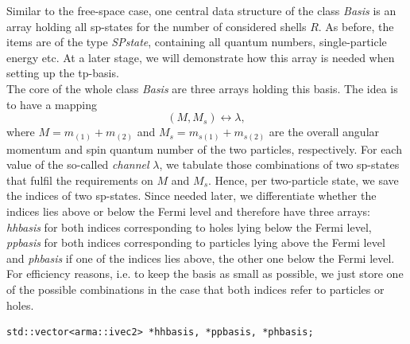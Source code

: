 Similar to the free-space case, one central data structure of the class \textit{Basis} is an array holding all sp-states for the number of considered shells $R$. As before, the items are of the type \textit{SPstate}, containing all quantum numbers, single-particle energy etc. At a later stage, we will demonstrate how this array is needed when setting up the tp-basis. \\
The core of the whole class \textit{Basis} are three arrays holding this basis. The idea is to have a mapping
\[
(M,M_s) \leftrightarrow \lambda,
\]
where $M = m_{(1)} + m_{(2)}$ and $M_s = m_{s(1)}+m_{s(2)}$ are the overall angular momentum and spin quantum number of the two particles, respectively. For each value of the so-called \textit{channel }$\lambda$, we tabulate those combinations of two sp-states that fulfil the requirements on $M$ and $M_s$. Hence, per two-particle state, we save the indices of two sp-states. Since needed later, we differentiate whether the indices lies above or below the Fermi level and therefore have three arrays: \textit{hhbasis} for both indices corresponding to holes lying below the Fermi level, \textit{ppbasis} for both indices corresponding to particles lying above the Fermi level and \textit{phbasis} if one of the indices lies above, the other one below the Fermi level. For efficiency reasons, i.e. to keep the basis as small as possible, we just store one of the possible combinations in the case that both indices refer to particles or holes.

\begin{lstlisting}[backgroundcolor=\color{lighter-gray},caption={\small Declaration of the three arrays saving the two-particle basis. Since we do not know the number of states in each channel in advance, we make use of the class \textit{vector} of the standard C++ library. The number of single-particle states, however, is always fixed to two, enabling us to use the type \textit{ivec2} of the Armadillo library.},numbers=none, label={lst:tp1}]
std::vector<arma::ivec2> *hhbasis, *ppbasis, *phbasis;
\end{lstlisting}

